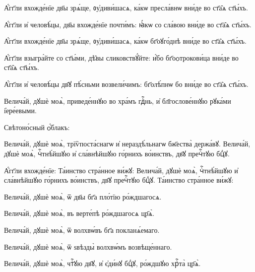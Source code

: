 \hKv А҆́гг҃ли вхожде́нїе дв҃ы зрѧ́ще, ᲂу҆диви́шасѧ, ка́кѡ  пресла́внѡ вни́де во ст҃а̑ѧ ст҃ы́хъ. 

\hKv А҆́гг҃ли и҆ человѣ́цы, дв҃ы вхожде́нїе почти́мъ: ꙗ҆́кѡ со  сла́вою вни́де во ст҃а̑ѧ ст҃ы́хъ. 

\hKv А҆́гг҃ли вхожде́нїе дв҃ы зрѧ́ще, ᲂу҆диви́шасѧ, ка́кѡ  бг҃оꙋго́днѣ вни́де во ст҃а̑ѧ ст҃ы́хъ. 

\hKv А҆́гг҃ли взыгра́йте со ст҃ы́ми, дѣ̑вы сликовствꙋ́йте: и҆́бо  бг҃оѻтрокови́ца вни́де во ст҃а̑ѧ ст҃ы́хъ. 

\hKv А҆́гг҃ли и҆ человѣ́цы дв҃ꙋ пѣ́сньми возвели́чимъ:  бг҃олѣ́пнѡ бо вни́де во ст҃а̑ѧ ст҃ы́хъ.  


\hKv Велича́й, дꙋшѐ моѧ̀, приведе́ннꙋю во хра́мъ гдⷭ҇нь, и҆  бл҃гослове́ннꙋю рꙋка́ми і҆ере́евыми. 

 Свѣтоно́сный ѻ҆́блакъ: 

%


\hKv Велича́й, дꙋшѐ моѧ̀, трїѷпоста́снагѡ и҆ нераздѣ́льнагѡ  бж҃ества̀ держа́вꙋ. 
%
%
\hKv Велича́й, дꙋшѐ моѧ̀, чⷭ҇тнѣ́йшꙋю и҆ сла́внѣйшꙋю го́рнихъ  во́инствъ, дв҃ꙋ пречⷭ҇тꙋю бцⷣꙋ. 

 А҆́гг҃ли вхожде́нїе: 
%
 Та́инство стра́нное ви́жꙋ: 
%
%
\hKv Велича́й, дꙋшѐ моѧ̀, чⷭ҇тнѣ́йшꙋю и҆ сла́внѣйшꙋю го́рнихъ  во́инствъ, дв҃ꙋ пречⷭ҇тꙋю бцⷣꙋ.  
%
 Та́инство стра́нное ви́жꙋ:  

%

\hKv Велича́й, дꙋшѐ моѧ̀, ѿ дв҃ы бг҃а пло́тїю ро́ждшагосѧ. 

\hKv Велича́й, дꙋшѐ моѧ̀, въ верте́пѣ ро́ждшагосѧ цр҃ѧ̀. 

\hKv Велича́й, дꙋшѐ моѧ̀, ѿ волхвѡ́въ бг҃а покланѧ́емаго. 

\hKv Велича́й, дꙋшѐ моѧ̀, ѿ ѕвѣзды̀ волхвѡ́мъ возвѣще́ннаго. 

\hKv Велича́й, дꙋшѐ моѧ̀, чтⷭ҇ꙋю дв҃ꙋ, и҆ є҆ди́нꙋ бцⷣꙋ,  ро́ждшꙋю хрⷭ҇та̀ цр҃ѧ̀. 

